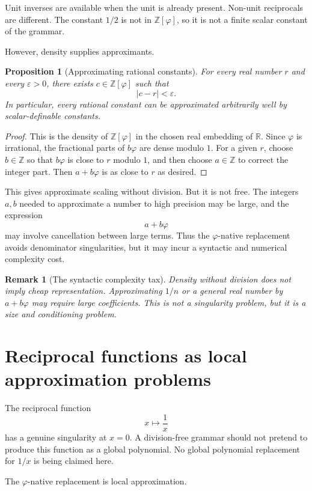 \documentclass[11pt]{article}
\newtheorem{proposition}[definition]{Proposition}
\newtheorem{remark}[definition]{Remark}
\newcommand{\ph}{\varphi}
\newcommand{\Z}{\mathbb{Z}}
\newcommand{\R}{\mathbb{R}}
\begin{document}
Unit inverses are available when the unit is already present.  Non-unit reciprocals are different.  The constant $1/2$ is not in $\Z[\ph]$, so it is not a finite scalar constant of the grammar.

However, density supplies approximants.

\begin{proposition}[Approximating rational constants]
For every real number $r$ and every $\varepsilon>0$, there exists $c\in\Z[\ph]$ such that
\[
    |c-r|<\varepsilon.
\]
In particular, every rational constant can be approximated arbitrarily well by scalar-definable constants.
\end{proposition}

\begin{proof}
This is the density of $\Z[\ph]$ in the chosen real embedding of $\R$.  Since $\ph$ is irrational, the fractional parts of $b\ph$ are dense modulo $1$.  For a given $r$, choose $b\in\Z$ so that $b\ph$ is close to $r$ modulo $1$, and then choose $a\in\Z$ to correct the integer part.  Then $a+b\ph$ is as close to $r$ as desired.
\end{proof}

This gives approximate scaling without division.  But it is not free.  The integers $a,b$ needed to approximate a number to high precision may be large, and the expression
\[
    a+b\ph
\]
may involve cancellation between large terms.  Thus the $\ph$-native replacement avoids denominator singularities, but it may incur a syntactic and numerical complexity cost.

\begin{remark}[The syntactic complexity tax]
Density without division does not imply cheap representation.  Approximating $1/n$ or a general real number by $a+b\ph$ may require large coefficients.  This is not a singularity problem, but it is a size and conditioning problem.
\end{remark}

\section{Reciprocal functions as local approximation problems}

The reciprocal function
\[
    x\mapsto \frac1x
\]
has a genuine singularity at $x=0$.  A division-free grammar should not pretend to produce this function as a global polynomial.  No global polynomial replacement for $1/x$ is being claimed here.

The $\ph$-native replacement is local approximation.
\end{document}
